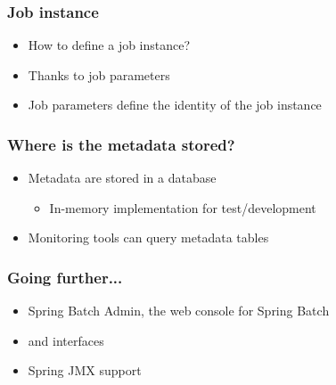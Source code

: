 \begin{frame}
\frametitle{Job instance}
\begin{itemize}
 \item How to define a job instance?
 \item Thanks to job parameters
 \item Job parameters define the identity of the job instance
\end{itemize}
\end{frame}

\begin{frame}
\frametitle{Where is the metadata stored?}
\begin{itemize}
 \item Metadata are stored in a database 
 \begin{itemize}
  \item In-memory implementation for test/development
 \end{itemize}
 \item Monitoring tools can query metadata tables
\end{itemize}
\end{frame}

\begin{frame}
 \frametitle{Going further...}
 \begin{itemize}
  \item Spring Batch Admin, the web console for Spring Batch
  \item {} and  interfaces
  \item Spring JMX support
 \end{itemize}
\end{frame}

